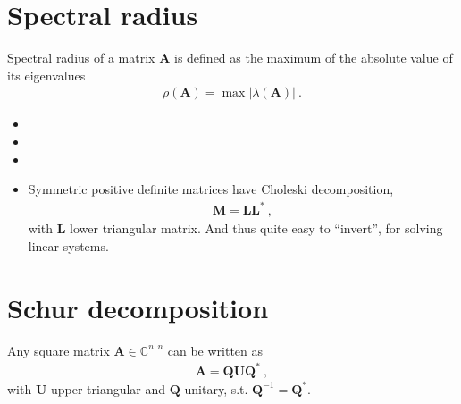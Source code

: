 \documentclass[letterpaper,10pt,english]{jupyterBook}
\begin{document}
\section{Spectral radius}
\label{\detokenize{ch/linear-algebra/matrix-factorization:spectral-radius}}\label{\detokenize{ch/linear-algebra/matrix-factorization:math-matrix-factorization-ev-spectral-radius}}
\sphinxAtStartPar
Spectral radius of a matrix \(\mathbf{A}\) is defined as the maximum of the absolute value of its eigenvalues
\begin{equation*}
\begin{split}\rho(\mathbf{A}) = \max |\lambda(\mathbf{A})| \ .\end{split}
\end{equation*}\begin{itemize}
\item {} 
\sphinxAtStartPar
{}

\item {} 
\sphinxAtStartPar
{}

\item {} 
\sphinxAtStartPar
{}

\item {} 
\sphinxAtStartPar
{} Symmetric positive definite matrices have Choleski decomposition,
\begin{equation*}
\begin{split}\mathbf{M} = \mathbf{L} \mathbf{L}^* \ ,\end{split}
\end{equation*}
\sphinxAtStartPar
with \(\mathbf{L}\) lower triangular matrix. And thus quite easy to “invert”, for solving linear systems.

\end{itemize}

\sphinxstepscope


\section{Schur decomposition}
\label{\detokenize{ch/linear-algebra/schur:schur-decomposition}}\label{\detokenize{ch/linear-algebra/schur:math-schur}}\label{\detokenize{ch/linear-algebra/schur::doc}}
\sphinxAtStartPar
Any square matrix \(\mathbf{A} \in \mathbb{C}^{n,n}\) can be written as
\begin{equation*}
\begin{split}\mathbf{A} = \mathbf{Q} \mathbf{U} \mathbf{Q}^* \ ,\end{split}
\end{equation*}
\sphinxAtStartPar
with \(\mathbf{U}\) upper triangular and \(\mathbf{Q}\) unitary, s.t. \(\mathbf{Q}^{-1} = \mathbf{Q}^*\).
\end{document}
